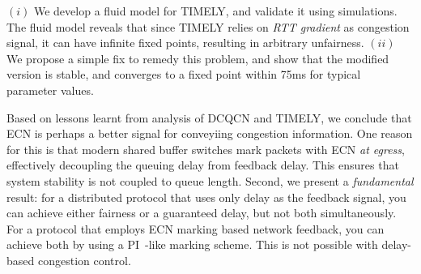  $(i)$ We develop a fluid model for TIMELY, and validate it using
simulations. The fluid model reveals that since TIMELY relies on {\em RTT
gradient} as congestion signal, it can have infinite fixed points, resulting in
arbitrary unfairness.  $(ii)$ We propose a simple fix to remedy this problem,
and show that the modified version is stable, and converges to a fixed point
within 75ms for typical parameter values.

 Based on lessons learnt from analysis of DCQCN and TIMELY,
we conclude that ECN is perhaps a better signal for conveyiing congestion
information. One reason for this is that modern shared buffer switches mark
packets with ECN {\em at egress}, effectively decoupling the queuing delay from
feedback delay. This ensures that system stability is not coupled to queue
length. Second, we present a \emph{fundamental} result: for a distributed
protocol that uses only delay as the feedback signal, you can achieve either
fairness or a guaranteed delay, but not both simultaneously. For a protocol that
employs ECN marking based network feedback, you can achieve both by using a
PI~\cite{hollot2001designing}-like marking scheme. This is not possible with
delay-based congestion control.



